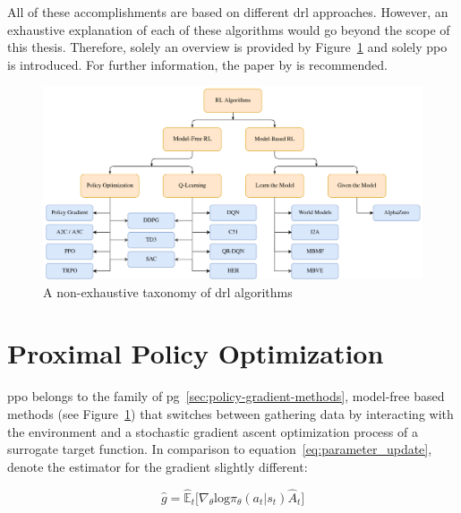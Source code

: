 \documentclass[draft,final]{vutinfth} %
\begin{document}
    All of these accomplishments are based on different \gls{drl} approaches.
    However, an exhaustive explanation of each of these algorithms would go beyond the scope of this thesis.
    Therefore, solely an overview is provided by Figure~\ref{fig:drl_taxonomy} and solely \gls{ppo} is introduced.
    For further information, the paper by \citeauthor{francois-lavet_introduction_2018} is recommended.

    \begin{figure}[h]
        \centering
        \includegraphics[width=\textwidth]{figures/drl_taxonomy.png}
        \caption[A non-exhaustive taxonomy of \acrlong{drl} algorithms]{A non-exhaustive taxonomy of \gls{drl} algorithms\protect\footnotemark}
        \label{fig:drl_taxonomy}
    \end{figure}



    \section{Proximal Policy Optimization}\label{sec:proximal-policy-optimization}
    \gls{ppo} belongs to the family of \gls{pg}~\eqref{sec:policy-gradient-methods}, model-free based methods (see Figure~\ref{fig:drl_taxonomy}) that switches between gathering data by interacting with the environment and a stochastic gradient ascent optimization process of a surrogate target function.
    In comparison to equation~\ref{eq:parameter_update}, \citet{schulman_proximal_2017} denote the estimator for the gradient slightly different:

    \begin{equation}
        \hat{g}=\hat{\mathbb{E}}_t \bigg [\nabla_\theta \text{log}\pi_\theta(a_t|s_t)\hat{A}_t\bigg]\label{eq:policy_gradient_method_maximization}
    \end{equation}
\end{document}

